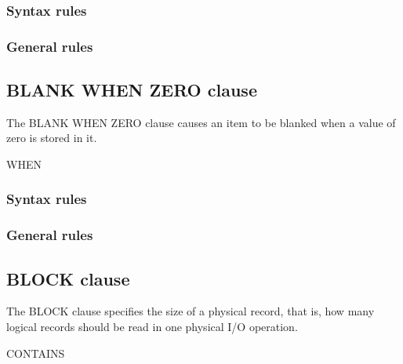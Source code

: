 \begin{syntax}
  \begin{1=}
     \\
     \\
     \\
  \end{1=}
\end{syntax}

\subsubsection{Syntax rules}

\subsubsection{General rules}


\subsection{BLANK WHEN ZERO clause}

The BLANK WHEN ZERO clause causes an item to be blanked when a value of zero is stored in it.

\begin{syntax}
   WHEN 
\end{syntax}

\subsubsection{Syntax rules}

\subsubsection{General rules}

\subsection{BLOCK clause}

The BLOCK clause specifies the size of a physical record, that is, how many logical records should be read in one physical I/O operation.

\begin{syntax}
   CONTAINS \integer
  \begin{0-1}
     \integer
  \end{0-1}
  \begin{0-1}
     \\
  \end{0-1}\\
\end{syntax}

